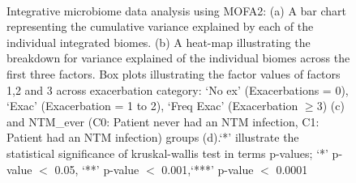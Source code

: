 \begin{figure}[h]
	\centering
	\\
	\caption{Integrative microbiome data analysis using MOFA2: (a) A bar chart representing the cumulative variance explained by each of the individual integrated biomes. (b) A heat-map illustrating the breakdown for variance explained of the individual biomes across the first three factors. Box plots illustrating the factor values of factors 1,2 and 3 across exacerbation category: `No ex' (Exacerbations = 0), `Exac' (Exacerbation = 1 to 2), `Freq Exac' (Exacerbation $\geq 3$) (c) and NTM\_ever (C0: Patient never had an NTM infection, C1: Patient had an NTM infection) groups (d).`*' illustrate the statistical significance of kruskal-wallis test in terms p-values; `*' p-value $<$ 0.05, `**' p-value $<$ 0.001,`***' p-value $<$ 0.0001}

\end{figure}
